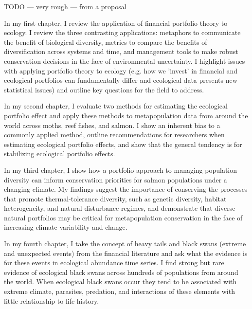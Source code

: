 
%
%


TODO --- very rough --- from a proposal


In my first chapter, I review the application of financial portfolio theory to
ecology. I review the three contrasting applications: metaphors to communicate
the benefit of biological diversity, metrics to compare the benefits of
diversification across systems and time, and management tools to make robust
conservation decisions in the face of environmental uncertainty. I highlight
issues with applying portfolio theory to ecology (e.g. how we 'invest' in
financial and ecological portfolios can fundamentally differ and ecological
data presents new statistical issues) and outline key questions for the field
to address.

In my second chapter, I evaluate two methods for estimating the ecological
portfolio effect and apply these methods to metapopulation data from around the
world across moths, reef fishes, and salmon. I show an inherent bias to a
commonly applied method, outline recommendations for researchers when
estimating ecological portfolio effects, and show that the general tendency is
for stabilizing ecological portfolio effects.

In my third chapter, I show how a portfolio approach to managing population
diversity can inform conservation priorities for salmon populations under a
changing climate. My findings suggest the importance of conserving the
processes that promote thermal-tolerance diversity, such as genetic diversity,
habitat heterogeneity, and natural disturbance regimes, and demonstrate that
diverse natural portfolios may be critical for metapopulation conservation in
the face of increasing climate variability and change.

In my fourth chapter, I take the concept of heavy tails and black swans
(extreme and unexpected events) from the financial literature and ask what the
evidence is for these events in ecological abundance time series. I find strong
but rare evidence of ecological black swans across hundreds of populations from
around the world. When ecological black swans occur they tend to be associated
with extreme climate, parasites, predation, and interactions of these elements
with little relationship to life history.
